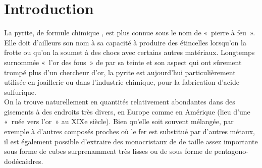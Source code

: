 \section{Introduction}

La pyrite, de formule chimique , est plus connue sous le nom de «~pierre à feu~». Elle doit d'ailleurs son nom à sa capacité à produire des étincelles lorsqu'on la frotte ou qu'on la soumet à des chocs avec certains autres matériaux. Longtemps surnommée «~l'or des fous~» de par sa teinte et son aspect qui ont sûrement trompé plus d'un chercheur d'or, la pyrite est aujourd'hui particulièrement utilisée en joaillerie ou dans l'industrie chimique, pour la fabrication d'acide sulfurique. \\
On la trouve naturellement en quantités relativement abondantes dans des gisements à des endroits très divers, en Europe comme en Amérique (lieu d'une «~ruée vers l'or~» au XIXe siècle). Bien qu'elle soit souvent mélangée, par exemple à d'autres composés proches où le fer est substitué par d'autres métaux, il est également possible d'extraire des monocristaux de  de taille assez importante sous forme de cubes surprenamment très lisses ou de sous forme de pentagono-dodécaèdres.

